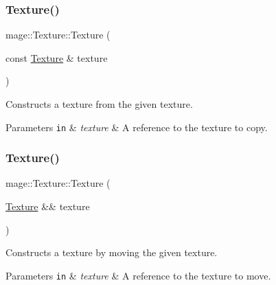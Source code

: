 \subsubsection{\texorpdfstring{Texture()}{Texture()}\hspace{0.1cm}{\footnotesize\ttfamily [5/6]}}
{\footnotesize\ttfamily mage\+::\+Texture\+::\+Texture (\begin{DoxyParamCaption}\item[{const \hyperlink{classmage_1_1_texture}{Texture} \&}]{texture }\end{DoxyParamCaption})\hspace{0.3cm}{\ttfamily [delete]}}

Constructs a texture from the given texture.


\begin{DoxyParams}[1]{Parameters}
\mbox{\tt in}  & {\em texture} & A reference to the texture to copy. \\
\hline
\end{DoxyParams}
\hypertarget{classmage_1_1_texture_a9297257bfe76e744cb02bbbb51f73348}{}\label{classmage_1_1_texture_a9297257bfe76e744cb02bbbb51f73348} 
\subsubsection{\texorpdfstring{Texture()}{Texture()}\hspace{0.1cm}{\footnotesize\ttfamily [6/6]}}
{\footnotesize\ttfamily mage\+::\+Texture\+::\+Texture (\begin{DoxyParamCaption}\item[{\hyperlink{classmage_1_1_texture}{Texture} \&\&}]{texture }\end{DoxyParamCaption})\hspace{0.3cm}{\ttfamily [default]}}

Constructs a texture by moving the given texture.


\begin{DoxyParams}[1]{Parameters}
\mbox{\tt in}  & {\em texture} & A reference to the texture to move. \\
\hline
\end{DoxyParams}
\hypertarget{classmage_1_1_texture_a81664804ac0259e8c67851409ee106fa}{}\label{classmage_1_1_texture_a81664804ac0259e8c67851409ee106fa} 
